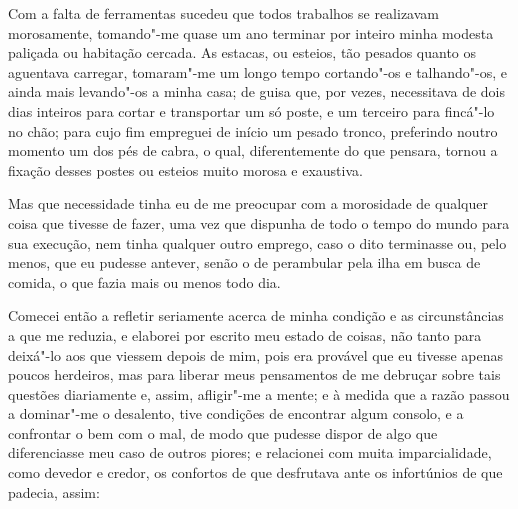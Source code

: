 Com a falta de ferramentas sucedeu que todos trabalhos se realizavam
morosamente, tomando"-me quase um ano terminar por inteiro minha modesta
paliçada ou habitação cercada. As estacas, ou esteios, tão pesados
quanto os aguentava carregar, tomaram"-me um longo tempo cortando"-os e
talhando"-os, e ainda mais levando"-os a minha casa; de guisa que, por
vezes, necessitava de dois dias inteiros para cortar e transportar um só
poste, e um terceiro para fincá"-lo no chão; para cujo fim empreguei de
início um pesado tronco, preferindo noutro momento um dos pés de cabra,
o qual, diferentemente do que pensara, tornou a fixação desses postes ou
esteios muito morosa e exaustiva.

Mas que necessidade tinha eu de me preocupar com a morosidade de
qualquer coisa que tivesse de fazer, uma vez que dispunha de todo o
tempo do mundo para sua execução, nem tinha qualquer outro emprego, caso
o dito terminasse ou, pelo menos, que eu pudesse antever, senão o de
perambular pela ilha em busca de comida, o que fazia mais ou menos todo
dia.

Comecei então a refletir seriamente acerca de minha condição e as
circunstâncias a que me reduzia, e elaborei por escrito meu estado de
coisas, não tanto para deixá"-lo aos que viessem depois de mim, pois era
provável que eu tivesse apenas poucos herdeiros, mas para liberar meus
pensamentos de me debruçar sobre tais questões diariamente e, assim,
afligir"-me a mente; e à medida que a razão passou a dominar"-me o
desalento, tive condições de encontrar algum consolo, e a confrontar o
bem com o mal, de modo que pudesse dispor de algo que diferenciasse meu
caso de outros piores; e relacionei com muita imparcialidade, como
devedor e credor, os confortos de que desfrutava ante os infortúnios de
que padecia, assim:


